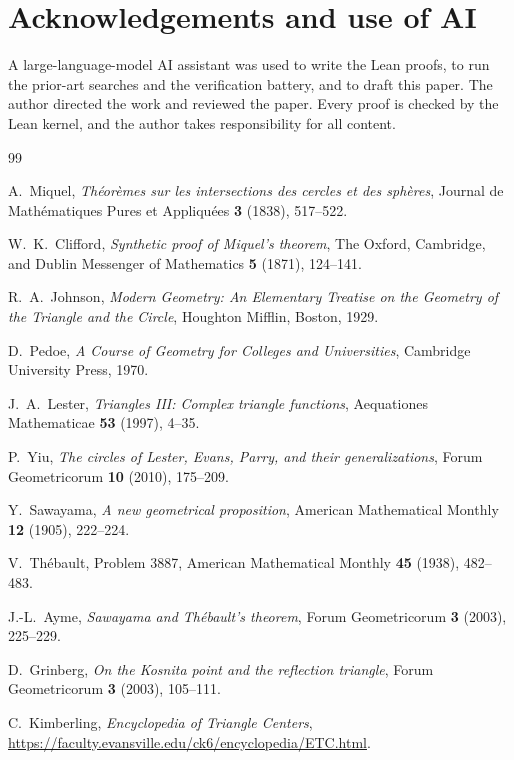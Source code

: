 \documentclass[11pt]{article}
\theoremstyle{definition}
\theoremstyle{remark}
\begin{document}
\section*{Acknowledgements and use of AI}
A large-language-model AI assistant was used to write the Lean proofs, to run the prior-art searches
and the verification battery, and to draft this paper. The author directed the work and reviewed the
paper. Every proof is checked by the Lean kernel, and the author takes responsibility for all content.

\begin{thebibliography}{99}

A.~Miquel,
\emph{Th\'eor\`emes sur les intersections des cercles et des sph\`eres},
Journal de Math\'ematiques Pures et Appliqu\'ees \textbf{3} (1838), 517--522.

W.~K.~Clifford,
\emph{Synthetic proof of Miquel's theorem},
The Oxford, Cambridge, and Dublin Messenger of Mathematics \textbf{5} (1871), 124--141.

R.~A.~Johnson,
\emph{Modern Geometry: An Elementary Treatise on the Geometry of the Triangle and the Circle},
Houghton Mifflin, Boston, 1929.

D.~Pedoe,
\emph{A Course of Geometry for Colleges and Universities},
Cambridge University Press, 1970.

J.~A.~Lester,
\emph{Triangles III: Complex triangle functions},
Aequationes Mathematicae \textbf{53} (1997), 4--35.

P.~Yiu,
\emph{The circles of Lester, Evans, Parry, and their generalizations},
Forum Geometricorum \textbf{10} (2010), 175--209.

Y.~Sawayama,
\emph{A new geometrical proposition},
American Mathematical Monthly \textbf{12} (1905), 222--224.

V.~Th\'ebault,
Problem 3887,
American Mathematical Monthly \textbf{45} (1938), 482--483.

J.-L.~Ayme,
\emph{Sawayama and Th\'ebault's theorem},
Forum Geometricorum \textbf{3} (2003), 225--229.

D.~Grinberg,
\emph{On the Kosnita point and the reflection triangle},
Forum Geometricorum \textbf{3} (2003), 105--111.

C.~Kimberling,
\emph{Encyclopedia of Triangle Centers},
\url{https://faculty.evansville.edu/ck6/encyclopedia/ETC.html}.


\end{thebibliography}
\end{document}
